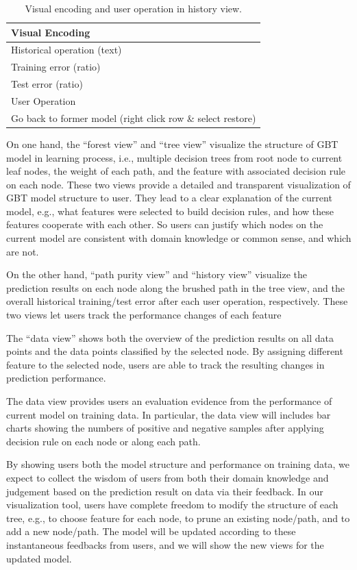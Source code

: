 \documentclass{chi2009}
\begin{document}
\begin{table}[ht]
\caption{Visual encoding and user operation in history view.}
\begin{center}
\begin{tabular}{|l|}
\hline
Visual Encoding\\
\hline
Historical operation (text)\\
Training error (ratio)\\
Test error (ratio)\\
\hline
\hline 
User Operation\\
\hline
Go back to former model (right click row \& select restore)\\
\hline
\end{tabular}
\end{center}
\end{table}

On one hand, the ``forest view'' and ``tree view'' visualize the structure of GBT model in learning process, i.e., multiple decision trees from root node to current leaf nodes, the weight of each path, and the feature with associated decision rule on each node. These two views provide a detailed and transparent visualization of GBT model structure to user. They lead to a clear explanation of the current model, e.g., what features were selected to build decision rules, and how these features cooperate with each other. So users can justify which nodes on the current model are consistent with domain knowledge or common sense, and which are not. 

On the other hand, ``path purity view'' and ``history view'' visualize the prediction results on each node along the brushed path in the tree view, and the overall historical training/test error after each user operation, respectively. These two views let users track the performance changes of each feature 

The “data view” shows both the overview of the prediction results on all data points and the data points classified by the selected node. By assigning different feature to the selected node, users are able to track the resulting changes in prediction performance.

The data view provides users an evaluation evidence from the performance of current model on training data. In particular, the data view will includes bar charts showing the numbers of positive and negative samples after applying decision rule on each node or along each path.

By showing users both the model structure and performance on training data, we expect to collect the wisdom of users from both their domain knowledge and judgement based on the prediction result on data via their feedback. In our visualization tool, users have complete freedom to modify the structure of each tree, e.g., to choose feature for each node, to prune an existing node/path, and to add a new node/path. The model will be updated according to these instantaneous feedbacks from users, and we will show the new views for the updated model. 
\end{document}
